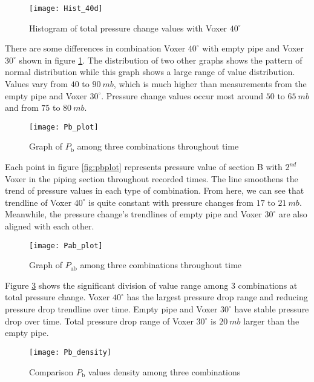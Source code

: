 \begin{figure}[h]
  \centering
  \texttt{[image: Hist\_40d]}
  \caption{ Histogram of total pressure change values  with Voxer $40^{\circ}$}
  \label{fig:hist40d}
\end{figure}

There are some differences in combination Voxer $40^{\circ}$ with empty pipe and Voxer $30^{\circ}$ shown in figure \ref{fig:hist40d}. The distribution of two other graphs shows the pattern of normal distribution while this graph shows a large range of value distribution. Values vary from $40$ to $90\ mb$, which is much higher than measurements from the empty pipe and Voxer $30^{\circ}$. Pressure change values occur most around $50$ to $65\ mb$ and from $75$ to $80\ mb$.

\begin{figure}[h]
  \centering
  \texttt{[image: Pb\_plot]}
  \caption{ Graph of $P_{\text{b}}$ among three combinations throughout time}
  \label{fig:pbplot}
\end{figure}

Each point in figure \vref{fig:pbplot} represents pressure value of section B with $2^{nd}$ Voxer in the piping section throughout recorded times. The line smoothens the trend of pressure values in each type of combination. From here, we can see that trendline of Voxer $40^{\circ}$ is quite constant with pressure changes from $17$ to $21\ mb$. Meanwhile, the pressure change's trendlines of empty pipe and Voxer $30^{\circ}$ are also aligned with each other. 

\begin{figure}[h]
  \centering
  \texttt{[image: Pab\_plot]}
  \caption{ Graph of $P_{\text{ab}}$ among three combinations throughout time}
  \label{fig:pabplot}
\end{figure}

Figure \ref{fig:pabplot} shows the significant division of value range among 3 combinations at total pressure change. Voxer $40^{\circ}$  has the largest pressure drop range and reducing pressure drop trendline over time. Empty pipe and Voxer $30^{\circ}$ have stable pressure drop over time. Total pressure drop range of Voxer $30^{\circ}$ is $20\ mb$ larger than the empty pipe. 
\newpage

\begin{figure}[h]
  \centering
  \texttt{[image: Pb\_density]}
  \caption{ Comparison $P_{\text{b}}$ values density among three combinations}
  \label{fig:pbdensity}
\end{figure}

